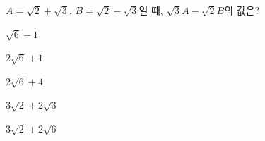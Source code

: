 $A=\sqrt{2}+\sqrt{3}$, $B=\sqrt{2}-\sqrt{3}$일 때, $\sqrt{3}A-\sqrt{2}B$의 값은?
\begin{choices32}{\rule[-3ex]{0pt}{8ex}$\sqrt{6}-1$}{\rule[-3ex]{0pt}{8ex}$2\sqrt{6}+1$}{\rule[-3ex]{0pt}{8ex}$2\sqrt{6}+4$}{\rule[-3ex]{0pt}{8ex}$3\sqrt{2}+2\sqrt{3}$}{\rule[-3ex]{0pt}{8ex}$3\sqrt{2}+2\sqrt{6}$}\end{choices32}
